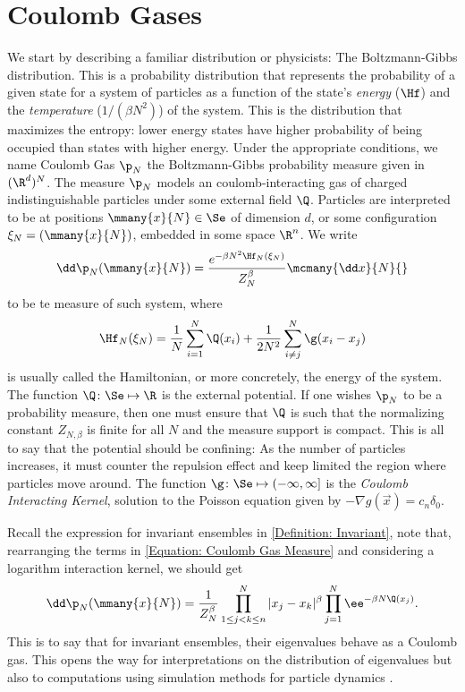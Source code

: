 \section{Coulomb Gases}
\label{section: Coulomb Gas}

We start by describing a familiar distribution or physicists: The Boltzmann-Gibbs distribution. This is a probability distribution that represents the probability of a given state for a system of particles as a function of the state's \textit{energy} ($\Hf$) and the \textit{temperature} ($1/(\beta N^2)$) of the system. This is the distribution that maximizes the entropy: lower energy states have higher probability of being occupied than states with higher energy. Under the appropriate conditions, we name Coulomb Gas $\p_N$ the Boltzmann-Gibbs probability measure given in $(\R^d)^N$. The measure $\p_N$ models an coulomb-interacting gas of charged indistinguishable particles under some external field $\Q$. Particles are interpreted to be at positions $\mmany{x}{N} \in \Se$ of dimension $d$, or some configuration $\xi_N = (\mmany{x}{N})$, embedded in some space $\R^n$. We write  
\begin{equation}
	\dd \p_N(\mmany{x}{N}) = \frac{e^{-\beta N^2 \Hf_N(\xi_N)}}{Z_{N}^{\beta}} \mcmany{\dd x}{N}{}
	\label{Equation: Coulomb Gas Measure}
\end{equation}
to be te measure of such system, where 
\begin{equation}
	\Hf_N(\xi_N) = \frac{1}{N} \sum_{i = 1}^{N} \Q(x_i) + \frac{1}{2N^2} \sum_{i \neq j}^{N} \g(x_i - x_j)	
\end{equation}
is usually called the Hamiltonian, or more concretely, the energy of the system. The function $\Q \colon \Se \mapsto \R$ is the external potential. If one wishes $\p_N$ to be a probability measure,  then one must ensure that $\Q$ is such that the normalizing constant $Z_{N, \beta}$ is finite for all $N$ and the measure support is compact. This is all to say that the potential should be confining: As the number of particles increases, it must counter the repulsion effect and keep limited the region where particles move around. The function $\g \colon \Se \mapsto (-\infty, \infty]$ is the \textit{Coulomb Interacting Kernel}, solution to the Poisson equation given by $- \nabla g(\vec{x}) = c_n\delta_0$.

Recall the expression for invariant ensembles in \autoref{Definition: Invariant}, note that, rearranging the terms in \autoref{Equation: Coulomb Gas Measure} and considering a logarithm interaction kernel, we should get
\begin{equation}
	\dd \p_N(\mmany{x}{N}) = \frac{1}{Z_{N}^{\beta}}\prod_{1\leq j < k \leq n}^N |x_j - x_k|^\beta \prod_{j=1}^{N} \ee^{- \beta N \Q(x_j)}.
\end{equation}
This is to say that for invariant ensembles, their eigenvalues behave as a Coulomb gas. This opens the way for interpretations on the distribution of eigenvalues but also to computations using simulation methods for particle dynamics \cite{Chafal}.


